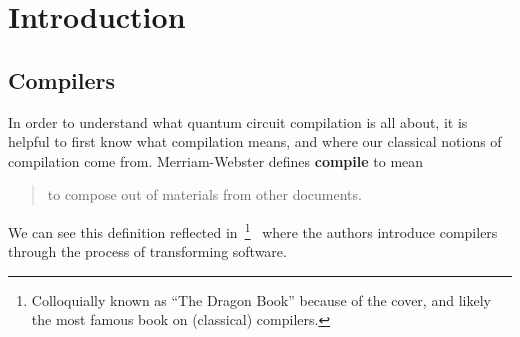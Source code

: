 \chapter{Introduction}\label{ch:introduction}

\section{Compilers}
In order to understand what quantum circuit compilation is all about, it is helpful to first know what compilation means, and where our classical notions of compilation come from.
Merriam-Webster defines \textbf{compile} to mean %
\begin{quote}
    to compose out of materials from other documents.
\end{quote}
We can see this definition reflected in~\footnote{Colloquially known as ``The Dragon Book'' because of the cover, and likely the most famous book on (classical) compilers.}~\cite{dragonbook} where the authors introduce compilers through the process of transforming software.
